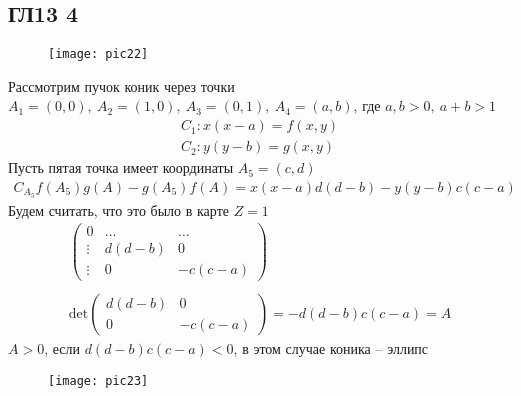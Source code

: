 \subsection*{ГЛ13 4}
\begin{figure}[h!]
	\center\texttt{[image: pic22]}
\end{figure}
\noindent
Рассмотрим пучок коник через точки $A_1 = (0,0),\ A_2 = (1,0),\ A_3 = (0,1),\ A_4 = (a,b)$, где $a,b > 0,\ a+b > 1$\\
\begin{gather*}
	C_1: x(x-a) = f(x,y)\\
	C_2: y(y-b) = g(x,y)
\end{gather*}
Пусть пятая точка имеет координаты $A_5 = (c,d)$\\
\begin{gather*}
	C_{A_5} f(A_5) g(A) - g(A_5) f(A) = x(x-a) d(d-b) - y(y-b) c(c-a)
\end{gather*}
Будем считать, что это было в карте $Z = 1$
\begin{gather*}
	\begin{pmatrix}
		0 & \ldots & \ldots\\
		\vdots & d(d-b) & 0\\
		\vdots & 0 & -c(c-a)
	\end{pmatrix}\\
	\\
	\text{det}
	\begin{pmatrix}
	d(d-b) & 0\\
	0 & -c(c-a)
	\end{pmatrix}
	=
	-d(d-b)c(c-a) = A
\end{gather*}
$A > 0$, если $d(d-b)c(c-a) < 0$, в этом случае коника -- эллипс
\begin{figure}[h!]
	\center\texttt{[image: pic23]}
\end{figure}